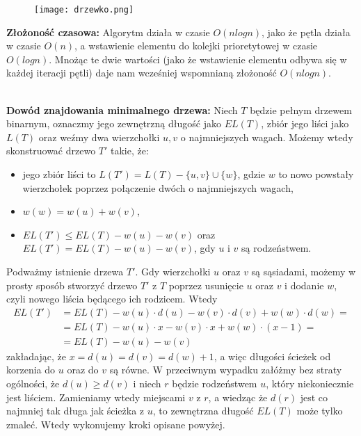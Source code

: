 \documentclass[a4paper,12pt]{article}
\begin{document}
\begin{figure}[H]
\centering
\texttt{[image: drzewko.png]}
\end{figure}

\noindent \textbf{Złożoność czasowa:} Algorytm działa w czasie $O(n log n)$, jako że pętla działa w czasie $O(n)$, a wstawienie elementu do kolejki prioretytowej w czasie $O(log n)$. Mnożąc te dwie wartości (jako że wstawienie elementu odbywa się w każdej iteracji pętli) daje nam wcześniej wspomnianą złożoność $O(n log n)$.  

~\\ \noindent \textbf{Dowód znajdowania minimalnego drzewa:} Niech $T$ będzie pełnym drzewem binarnym, oznaczmy jego zewnętrzną długość jako $EL(T)$, zbiór jego liści jako $L(T)$ oraz weźmy dwa wierzchołki $u, v$ o najmniejszych wagach. Możemy wtedy skonstruować drzewo $T'$ takie, że:
\begin{itemize}
\item jego zbiór liści to $L(T') = L(T) - \{ u, v\} \cup \{ w \}$, gdzie $w$ to nowo powstały wierzchołek poprzez połączenie dwóch o najmniejszych wagach,
\item $w(w) = w(u) + w(v)$,
\item $EL(T') \leq EL(T) - w(u) - w(v)$ oraz $EL(T') = EL(T) - w(u) - w(v)$, gdy $u$ i $v$ są rodzeństwem.
\end{itemize}
\noindent Podważmy istnienie drzewa $T'$. Gdy wierzchołki $u$ oraz $v$ są sąsiadami, możemy w prosty sposób stworzyć drzewo $T'$ z $T$ poprzez usunięcie $u$ oraz $v$ i dodanie $w$, czyli nowego liścia będącego ich rodzicem. Wtedy 
$$
\begin{aligned}
EL(T') &= EL(T) - w(u) \cdot d(u) - w(v) \cdot d(v) + w(w) \cdot d(w) = \\
          &= EL(T) - w(u) \cdot x - w(v) \cdot x + w(w) \cdot (x - 1) = \\
          &= EL(T) - w(u) - w(v)
\end{aligned}
$$
\noindent zakładając, że $x = d(u) = d(v) = d(w) + 1$, a więc długości ścieżek od korzenia do $u$ oraz do $v$ są równe. \newline
W przeciwnym wypadku załóżmy bez straty ogólności, że $d(u) \geq d(v)$ i niech $r$ będzie rodzeństwem $u$, który niekoniecznie jest liściem. Zamieniamy wtedy miejscami $v$ z $r$, a wiedząc że $d(r)$ jest co najmniej tak długa jak ścieżka z $u$, to zewnętrzna długość $EL(T)$ może tylko zmaleć. Wtedy wykonujemy kroki opisane powyżej.
\end{document}
